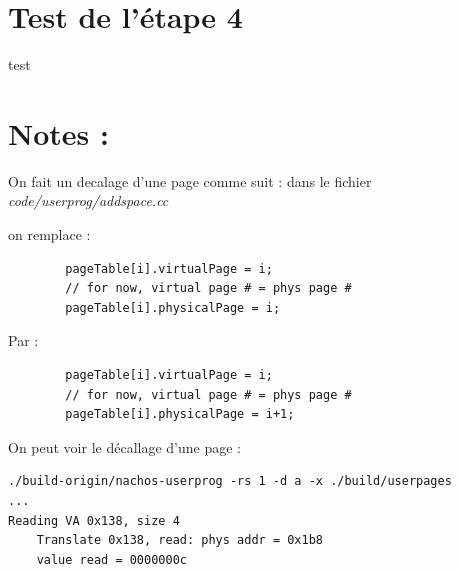 \documentclass[a4paper,10pt]{article}
\begin{document}
\section{Test de l'étape 4}

test

\section{Notes : }

On fait un decalage d'une page comme suit :
dans le fichier \textit{code/userprog/addspace.cc}

on remplace :
\begin{lstlisting}
        pageTable[i].virtualPage = i;
        // for now, virtual page # = phys page #
        pageTable[i].physicalPage = i;
\end{lstlisting}

Par :
\begin{lstlisting}
        pageTable[i].virtualPage = i;
        // for now, virtual page # = phys page #
        pageTable[i].physicalPage = i+1;
\end{lstlisting}

On peut voir le décallage d'une page :
\begin{lstlisting}
./build-origin/nachos-userprog -rs 1 -d a -x ./build/userpages
...
Reading VA 0x138, size 4
    Translate 0x138, read: phys addr = 0x1b8
    value read = 0000000c
\end{lstlisting}
\end{document}
